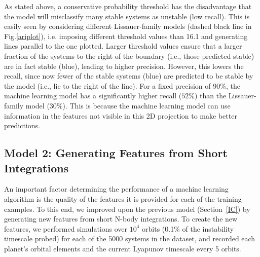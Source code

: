 As stated above, a conservative probability threshold has the disadvantage that the model will misclassify many stable systems as unstable (low recall).  
This is easily seen by considering different Lissauer-family models (dashed black line in Fig.\:\ref{ariplot}), i.e. imposing different threshold values than 16.1 and generating lines parallel to the one plotted.
Larger threshold values ensure that a larger fraction of the systems to the right of the boundary (i.e., those predicted stable) are in fact stable (blue), leading to higher precision.
However, this lowers the recall, since now fewer of the stable systems (blue) are predicted to be stable by the model (i.e., lie to the right of the line).
For a fixed precision of 90\%, the machine learning model has a significantly higher recall ($52\%$) than the Lissauer-family model ($30\%$). 
This is because the machine learning model can use information in the features not visible in this 2D projection to make better predictions.


\subsection{Model 2: Generating Features from Short Integrations} \label{shortintegrations}

An important factor determining the performance of a machine learning algorithm is the quality of the features it is provided for each of the training examples.
To this end, we improved upon the previous model (Section~\ref{IC}) by generating new features from short N-body integrations.
To create the new features, we performed simulations over $10^4$ orbits (0.1\% of the instability timescale probed) for each of the 5000 systems in the dataset, and recorded each planet's orbital elements and the current Lyapunov timescale every 5 orbits.

